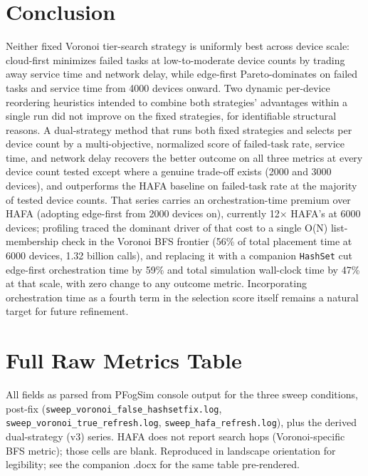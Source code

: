 \documentclass[10pt,conference]{IEEEtran}
\begin{document}
\section{Conclusion}\label{sec:conclusion}
Neither fixed Voronoi tier-search strategy is uniformly best across device scale: cloud-first minimizes failed tasks at low-to-moderate device counts by trading away service time and network delay, while edge-first Pareto-dominates on failed tasks and service time from 4000 devices onward. Two dynamic per-device reordering heuristics intended to combine both strategies' advantages within a single run did not improve on the fixed strategies, for identifiable structural reasons. A dual-strategy method that runs both fixed strategies and selects per device count by a multi-objective, normalized score of failed-task rate, service time, and network delay recovers the better outcome on all three metrics at every device count tested except where a genuine trade-off exists (2000 and 3000 devices), and outperforms the HAFA baseline on failed-task rate at the majority of tested device counts. That series carries an orchestration-time premium over HAFA (adopting edge-first from 2000 devices on), currently 12$\times$ HAFA's at 6000 devices; profiling traced the dominant driver of that cost to a single O(N) list-membership check in the Voronoi BFS frontier (56\% of total placement time at 6000 devices, 1.32 billion calls), and replacing it with a companion \texttt{HashSet} cut edge-first orchestration time by 59\% and total simulation wall-clock time by 47\% at that scale, with zero change to any outcome metric. Incorporating orchestration time as a fourth term in the selection score itself remains a natural target for future refinement.

\appendices
\section{Full Raw Metrics Table}\label{app:rawdata}
All fields as parsed from PFogSim console output for the three sweep conditions, post-fix (\texttt{sweep\_voronoi\_false\_hashsetfix.log}, \texttt{sweep\_voronoi\_true\_refresh.log}, \texttt{sweep\_hafa\_refresh.log}), plus the derived dual-strategy (v3) series. HAFA does not report search hops (Voronoi-specific BFS metric); those cells are blank. Reproduced in landscape orientation for legibility; see the companion .docx for the same table pre-rendered.
\end{document}

